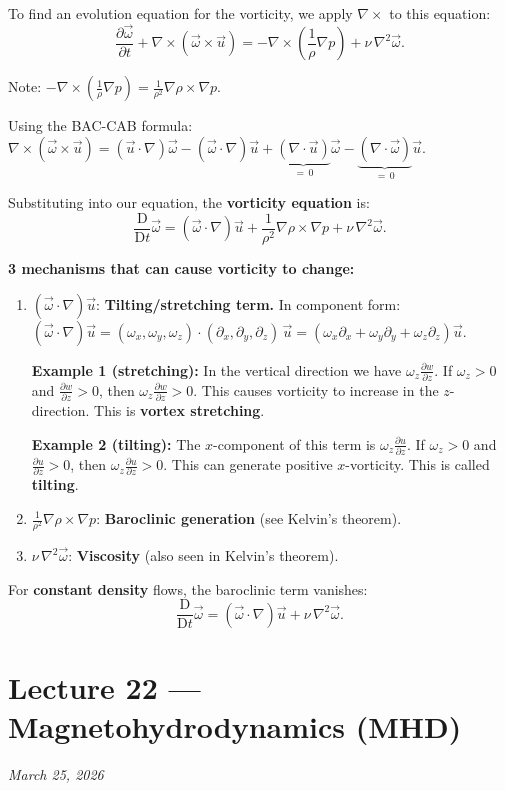 \documentclass[11pt,a4paper]{article}
\newcommand{\D}{\mathrm{D}}
\newcommand{\Dt}{\frac{\D}{\D t}}
\newcommand{\pdt}[1]{\frac{\partial #1}{\partial t}}
\newcommand{\pdx}[2]{\frac{\partial #1}{\partial #2}}
\newcommand{\uv}{\vec{u}}
\newcommand{\omv}{\vec{\omega}}
\begin{document}
To find an evolution equation for the vorticity, we apply $\nabla\times$ to this equation:
\[
    \pdt{\omv} + \nabla\times(\omv\times\uv) = -\nabla\times\!\left(\frac{1}{\rho}\nabla p\right) + \nu\,\nabla^2\omv.
\]

Note: $-\nabla\times\!\left(\frac{1}{\rho}\nabla p\right) = \frac{1}{\rho^2}\nabla\rho\times\nabla p$.

Using the BAC-CAB formula: $\nabla\times(\omv\times\uv) = (\uv\cdot\nabla)\omv - (\omv\cdot\nabla)\uv + \underbrace{(\nabla\cdot\uv)}_{=\,0}\omv - \underbrace{(\nabla\cdot\omv)}_{=\,0}\uv$.

Substituting into our equation, the \textbf{vorticity equation} is:
\[
    \boxed{\Dt\omv = (\omv\cdot\nabla)\uv + \frac{1}{\rho^2}\nabla\rho\times\nabla p + \nu\,\nabla^2\omv.}
\]

\textbf{3 mechanisms that can cause vorticity to change:}
\begin{enumerate}[label=(\roman*)]
    \item $(\omv\cdot\nabla)\uv$: \textbf{Tilting/stretching term.} In component form: $(\omv\cdot\nabla)\uv = (\omega_x, \omega_y, \omega_z)\cdot(\partial_x, \partial_y, \partial_z)\,\uv = (\omega_x\partial_x + \omega_y\partial_y + \omega_z\partial_z)\uv$.

    \textbf{Example 1 (stretching):} In the vertical direction we have $\omega_z\pdx{w}{z}$. If $\omega_z > 0$ and $\pdx{w}{z} > 0$, then $\omega_z\pdx{w}{z} > 0$. This causes vorticity to increase in the $z$-direction. This is \textbf{vortex stretching}.

    \textbf{Example 2 (tilting):} The $x$-component of this term is $\omega_z\pdx{u}{z}$. If $\omega_z > 0$ and $\pdx{u}{z} > 0$, then $\omega_z\pdx{u}{z} > 0$. This can generate positive $x$-vorticity. This is called \textbf{tilting}.

    \item $\frac{1}{\rho^2}\nabla\rho\times\nabla p$: \textbf{Baroclinic generation} (see Kelvin's theorem).
    \item $\nu\,\nabla^2\omv$: \textbf{Viscosity} (also seen in Kelvin's theorem).
\end{enumerate}

For \textbf{constant density} flows, the baroclinic term vanishes:
\[
    \Dt\omv = (\omv\cdot\nabla)\uv + \nu\,\nabla^2\omv.
\]

\section{Lecture 22 --- Magnetohydrodynamics (MHD)}
\textit{March 25, 2026}
\end{document}
